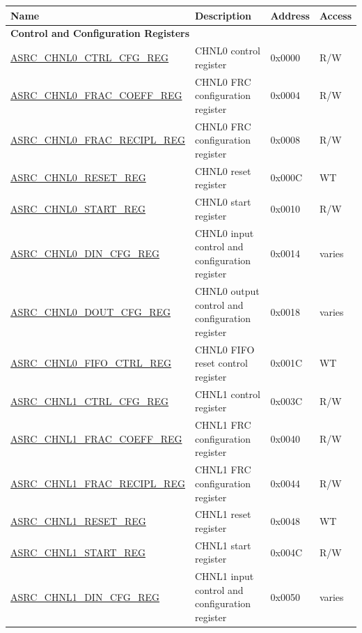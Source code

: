 \begin{longtable}{ | p{5.4cm} | p{7.3cm} | p{1.3cm} | p{1.5cm} | }
\hline\rowcolor{lightgray}
Name & Description &  Address & Access \\ \hline
\endhead
\multicolumn{4}{|l|}{\textbf{Control and Configuration Registers}} \\ \hline
\hyperref[regdesc:ASRCCHNL0CTRLCFGREG]{ASRC\_CHNL0\_CTRL\_CFG\_REG} & CHNL0 control register & 0x0000 & R/W \\ \hline
\hyperref[regdesc:ASRCCHNL0FRACCOEFFREG]{ASRC\_CHNL0\_FRAC\_COEFF\_REG} & CHNL0 FRC configuration register & 0x0004 & R/W \\ \hline
\hyperref[regdesc:ASRCCHNL0FRACRECIPLREG]{ASRC\_CHNL0\_FRAC\_RECIPL\_REG} & CHNL0 FRC configuration register & 0x0008 & R/W \\ \hline
\hyperref[regdesc:ASRCCHNL0RESETREG]{ASRC\_CHNL0\_RESET\_REG} & CHNL0 reset register & 0x000C & WT \\ \hline
\hyperref[regdesc:ASRCCHNL0STARTREG]{ASRC\_CHNL0\_START\_REG} & CHNL0 start register & 0x0010 & R/W \\ \hline
\hyperref[regdesc:ASRCCHNL0DINCFGREG]{ASRC\_CHNL0\_DIN\_CFG\_REG} & CHNL0 input control and configuration register & 0x0014 & varies \\ \hline
\hyperref[regdesc:ASRCCHNL0DOUTCFGREG]{ASRC\_CHNL0\_DOUT\_CFG\_REG} & CHNL0 output control and configuration register & 0x0018 & varies \\ \hline
\hyperref[regdesc:ASRCCHNL0FIFOCTRLREG]{ASRC\_CHNL0\_FIFO\_CTRL\_REG} & CHNL0 FIFO reset control register & 0x001C & WT \\ \hline
\hyperref[regdesc:ASRCCHNL1CTRLCFGREG]{ASRC\_CHNL1\_CTRL\_CFG\_REG} & CHNL1 control register & 0x003C & R/W \\ \hline
\hyperref[regdesc:ASRCCHNL1FRACCOEFFREG]{ASRC\_CHNL1\_FRAC\_COEFF\_REG} & CHNL1 FRC configuration register & 0x0040 & R/W \\ \hline
\hyperref[regdesc:ASRCCHNL1FRACRECIPLREG]{ASRC\_CHNL1\_FRAC\_RECIPL\_REG} & CHNL1 FRC configuration register & 0x0044 & R/W \\ \hline
\hyperref[regdesc:ASRCCHNL1RESETREG]{ASRC\_CHNL1\_RESET\_REG} & CHNL1 reset register & 0x0048 & WT \\ \hline
\hyperref[regdesc:ASRCCHNL1STARTREG]{ASRC\_CHNL1\_START\_REG} & CHNL1 start register & 0x004C & R/W \\ \hline
\hyperref[regdesc:ASRCCHNL1DINCFGREG]{ASRC\_CHNL1\_DIN\_CFG\_REG} & CHNL1 input control and configuration register & 0x0050 & varies \\ \hline

\end{longtable}
